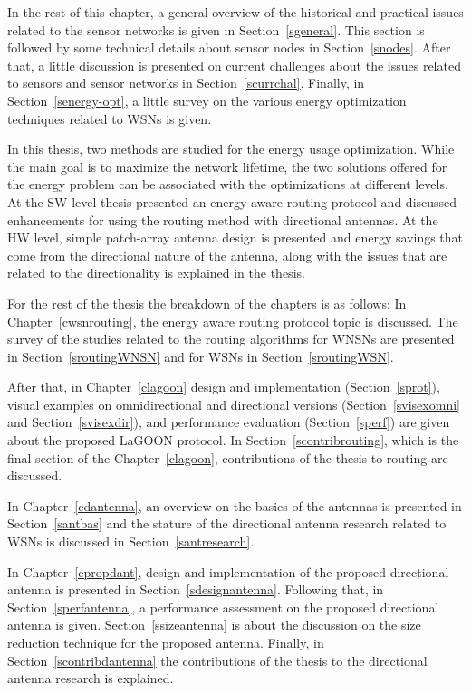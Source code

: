 \documentclass[12pt, oneandhalf, chaparabic, sees, ms]{metu}
\begin{document}
In the rest of this chapter, a general overview of the historical and practical issues related to the sensor networks is given in Section~\ref{sgeneral}.
This section is followed by some technical details about sensor nodes in Section~\ref{snodes}. 
After that, a little discussion is presented on current challenges about the issues related to sensors and sensor networks in Section~\ref{scurrchal}.
Finally, in Section~\ref{senergy-opt}, a little survey on the various energy optimization techniques related to WSNs is given.


In this thesis, two methods are studied for the energy usage optimization. While the main goal is to maximize the network lifetime, the two solutions offered 
for the energy problem can be associated with the optimizations at different levels. At the SW level thesis presented an energy aware routing protocol and 
discussed enhancements for using the routing method with directional antennas. At the HW level, simple patch-array antenna design is presented and
energy savings that come from the directional nature of the antenna, along with the issues that are related to the directionality is explained in the thesis.

\newpage
For the rest of the thesis the breakdown of the chapters is as follows:
In Chapter~\ref{cwsnrouting}, the energy aware routing protocol topic is discussed. 
The survey of the studies related to the routing algorithms for WNSNs are presented in Section~\ref{sroutingWNSN} and for WSNs in Section~\ref{sroutingWSN}. 

After that, in Chapter~\ref{clagoon} design and implementation (Section~\ref{sprot}),
visual examples on omnidirectional and directional versions (Section~\ref{svisexomni} and Section~\ref{svisexdir}), and performance evaluation (Section~\ref{sperf})
are given about the proposed LaGOON protocol. In Section~\ref{scontribrouting}, which is the final section of the Chapter~\ref{clagoon}, contributions of the thesis to routing 
are discussed.

In Chapter~\ref{cdantenna}, an overview on the basics of the antennas is presented in Section~\ref{santbas} and
the stature of the directional antenna research related to WSNs is discussed in Section~\ref{santresearch}.

In Chapter~\ref{cpropdant}, design and implementation of the proposed directional antenna is presented in Section~\ref{sdesignantenna}. 
Following that, in Section~\ref{sperfantenna}, a performance assessment on the proposed directional antenna is given. Section~\ref{ssizeantenna} is about the discussion
on the size reduction technique for the proposed antenna. Finally, in Section~\ref{scontribdantenna} the contributions of the thesis to
the directional antenna research is explained.
\end{document}
